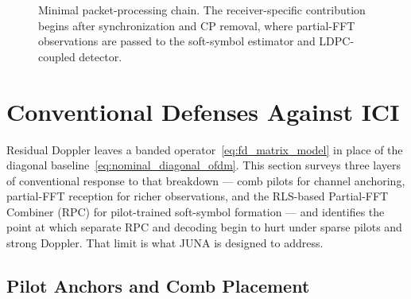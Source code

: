 \documentclass{wileysev}
\begin{document}
	
	\begin{figure}[tbp]
		\centering
		\caption{Minimal packet-processing chain. The receiver-specific contribution begins after synchronization and CP removal, where partial-FFT observations are passed to the soft-symbol estimator and LDPC-coupled detector.}
		\label{fig:typical_ofdm_chain}
	\end{figure}
	
	\section{Conventional Defenses Against ICI}
	\label{chap:defenses}
	
	Residual Doppler leaves a banded operator~\eqref{eq:fd_matrix_model} in place of the diagonal baseline~\eqref{eq:nominal_diagonal_ofdm}. This section surveys three layers of conventional response to that breakdown --- comb pilots for channel anchoring, partial-FFT reception for richer observations, and the RLS-based Partial-FFT Combiner (RPC) for pilot-trained soft-symbol formation --- and identifies the point at which separate RPC and decoding begin to hurt under sparse pilots and strong Doppler. That limit is what JUNA is designed to address.
	
	\subsection{Pilot Anchors and Comb Placement}
	\label{ssec:pilot-grid}
	
\end{document}
